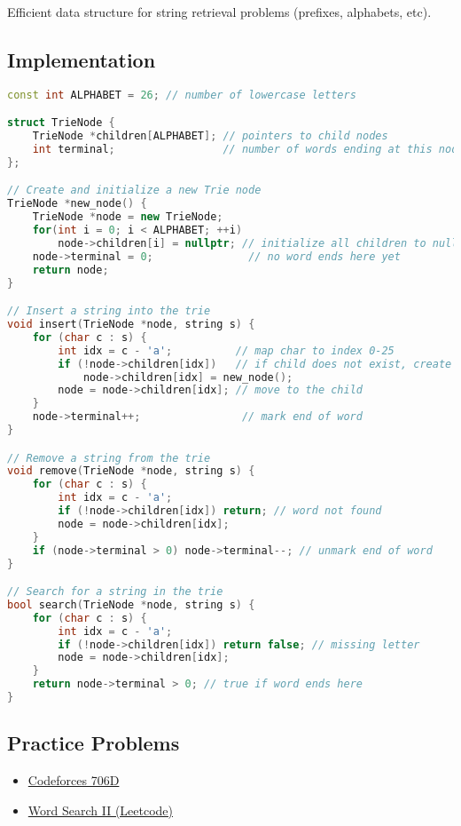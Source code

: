 \documentclass[12pt]{article}
\begin{document}
Efficient data structure for string retrieval problems (prefixes, alphabets, etc).

\subsection{Implementation}

\begin{lstlisting}[language=C++]
const int ALPHABET = 26; // number of lowercase letters

struct TrieNode {
    TrieNode *children[ALPHABET]; // pointers to child nodes
    int terminal;                 // number of words ending at this node
};

// Create and initialize a new Trie node
TrieNode *new_node() {
    TrieNode *node = new TrieNode;
    for(int i = 0; i < ALPHABET; ++i)
        node->children[i] = nullptr; // initialize all children to null
    node->terminal = 0;               // no word ends here yet
    return node;
}

// Insert a string into the trie
void insert(TrieNode *node, string s) {
    for (char c : s) {
        int idx = c - 'a';          // map char to index 0-25
        if (!node->children[idx])   // if child does not exist, create it
            node->children[idx] = new_node();
        node = node->children[idx]; // move to the child
    }
    node->terminal++;                // mark end of word
}

// Remove a string from the trie
void remove(TrieNode *node, string s) {
    for (char c : s) {
        int idx = c - 'a';
        if (!node->children[idx]) return; // word not found
        node = node->children[idx];
    }
    if (node->terminal > 0) node->terminal--; // unmark end of word
}

// Search for a string in the trie
bool search(TrieNode *node, string s) {
    for (char c : s) {
        int idx = c - 'a';
        if (!node->children[idx]) return false; // missing letter
        node = node->children[idx];
    }
    return node->terminal > 0; // true if word ends here
}
\end{lstlisting}

\subsection{Practice Problems}
\begin{itemize}
    \item \href{https://codeforces.com/problemset/problem/706/D}{Codeforces 706D}
    \item \href{https://leetcode.com/problems/word-search-ii/description/}{Word Search II (Leetcode)}
\end{itemize}
\end{document}
